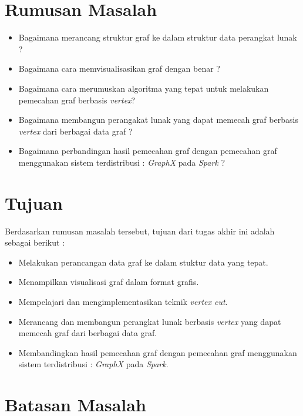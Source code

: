 \section{Rumusan Masalah}
\label{sec:rumusan}
\begin{itemize}
	\item Bagaimana merancang struktur graf ke dalam struktur data perangkat lunak ?
	\item Bagaimana cara memvisualisasikan graf dengan benar ?
	\item Bagaimana cara merumuskan algoritma yang tepat untuk melakukan pemecahan graf berbasis {\it vertex}?
	\item Bagaimana membangun perangakat lunak yang dapat memecah graf berbasis {\it vertex} dari berbagai data graf ?
	\item Bagaimana perbandingan hasil pemecahan graf dengan pemecahan graf menggunakan sistem terdistribusi : {\it GraphX} pada {\it Spark} ?

\end{itemize}



\section{Tujuan}
\label{sec:tujuan}
Berdasarkan rumusan masalah tersebut, tujuan dari tugas akhir ini adalah sebagai berikut :
\begin{itemize}
\item Melakukan perancangan data graf ke dalam stuktur data yang tepat. 
\item Menampilkan visualisasi graf dalam format grafis.
\item Mempelajari dan mengimplementasikan teknik {\it vertex cut}.
\item Merancang dan membangun perangkat lunak berbasis {\it vertex} yang dapat memecah graf dari berbagai data graf.
\item Membandingkan hasil pemecahan graf dengan pemecahan graf menggunakan sistem terdistribusi : {\it GraphX} pada {\it Spark}.
\end{itemize}


\section{Batasan Masalah}
\label{sec:batasan}

